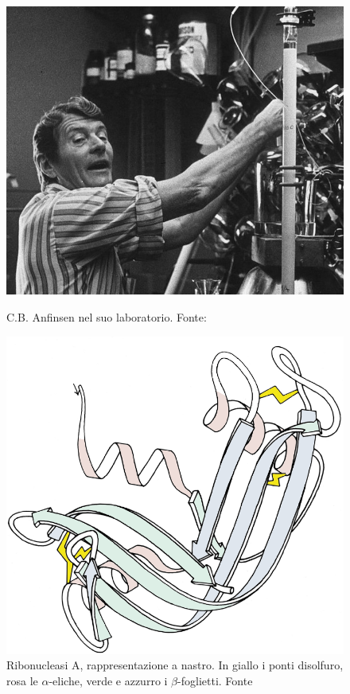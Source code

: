 {{\begin{figure}[!htb]
	\centering
	\includegraphics[scale=0.25]{images/anfinsen.jpg}
	\caption{C.B. Anfinsen nel suo laboratorio. Fonte: \cite{anfinsenNIH}}
	\label{fig:anfinsen}
	\endminipage\hfill
	\centering
	\includegraphics[scale=0.2]{images/RibonucleaseA_SS_paleRib.png}
	\caption{Ribonucleasi A, rappresentazione a nastro. In giallo i ponti disolfuro, rosa le $\alpha$-eliche, verde e azzurro i $\beta$-foglietti. Fonte \cite{ribonucleasi-file}}
	\label{fig:ribonucleasi}
	\endminipage\hfill
\end{figure}
}
}
